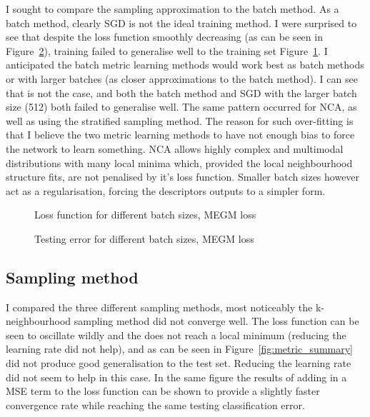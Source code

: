 I sought to compare the sampling approximation to the batch method.
As a batch method, clearly \gls{SGD} is not the ideal training method. I were
surprised to see that despite the loss function smoothly decreasing (as can be
seen in Figure~\ref{fig:metric_megm_test}), training failed to generalise well to the training set Figure~\ref{fig:metric_megm_loss}.
I anticipated the batch metric learning methods would work best as batch
methods or with larger batches (as closer approximations to the batch method).
I can see that is not the case, and both the batch method and \gls{SGD} with the
larger batch size (512) both failed to generalise well. The same pattern occurred
for \gls{NCA}, as well as using the stratified sampling method.
The reason for such over-fitting is that I believe the two metric learning
methods to have not enough bias to force the network to learn something. \gls{NCA}
allows highly complex and multimodal distributions with many local minima
which, provided the local neighbourhood structure fits, are not penalised by it’s
loss function. Smaller batch sizes however act as a regularisation, forcing the
descriptors outputs to a simpler form.



\begin{figure}[ht]
   
   \caption{Loss function for different batch sizes, MEGM loss}
   \label {fig:metric_megm_loss}
\end{figure}

\begin{figure}[ht]
   
   \caption{Testing error for different batch sizes, MEGM loss}
   \label {fig:metric_megm_test}
\end{figure}



\subsection{Sampling method}

I compared the three different sampling methods, most noticeably the k-neighbourhood sampling method did not converge well. The loss function can be seen to oscillate wildly and the does not reach a local minimum (reducing the learning rate did not help), and as can be seen in Figure~\ref{fig:metric_summary} did not produce good generalisation to the test set. Reducing the learning rate did not seem to help in this case. In the same figure the results of adding in a \gls{MSE} term to the loss function can be shown to provide a slightly faster convergence rate while reaching the same testing classification error.


